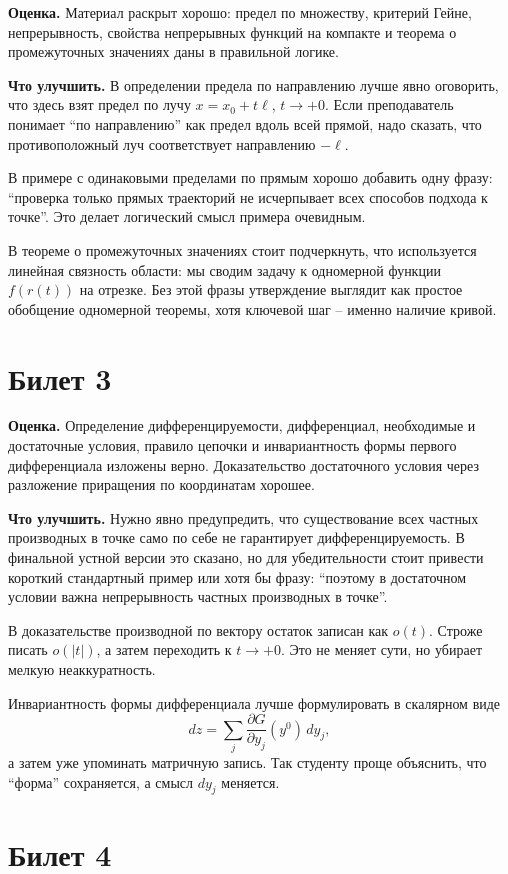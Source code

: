 \documentclass[12pt,a4paper]{article}
\begin{document}
\textbf{Оценка.} Материал раскрыт хорошо: предел по множеству, критерий
Гейне, непрерывность, свойства непрерывных функций на компакте и теорема о
промежуточных значениях даны в правильной логике.

\textbf{Что улучшить.}
В определении предела по направлению лучше явно оговорить, что здесь взят
предел по лучу \(x=x_0+t\ell\), \(t\to+0\). Если преподаватель понимает
``по направлению'' как предел вдоль всей прямой, надо сказать, что
противоположный луч соответствует направлению \(-\ell\).

В примере с одинаковыми пределами по прямым хорошо добавить одну фразу:
``проверка только прямых траекторий не исчерпывает всех способов подхода к
точке''. Это делает логический смысл примера очевидным.

В теореме о промежуточных значениях стоит подчеркнуть, что используется
линейная связность области: мы сводим задачу к одномерной функции
\(f(r(t))\) на отрезке. Без этой фразы утверждение выглядит как простое
обобщение одномерной теоремы, хотя ключевой шаг -- именно наличие кривой.

\section*{Билет 3}

\textbf{Оценка.} Определение дифференцируемости, дифференциал, необходимые и
достаточные условия, правило цепочки и инвариантность формы первого
дифференциала изложены верно. Доказательство достаточного условия через
разложение приращения по координатам хорошее.

\textbf{Что улучшить.}
Нужно явно предупредить, что существование всех частных производных в точке
само по себе не гарантирует дифференцируемость. В финальной устной версии это
сказано, но для убедительности стоит привести короткий стандартный пример или
хотя бы фразу: ``поэтому в достаточном условии важна непрерывность частных
производных в точке''.

В доказательстве производной по вектору остаток записан как \(o(t)\). Строже
писать \(o(|t|)\), а затем переходить к \(t\to+0\). Это не меняет сути, но
убирает мелкую неаккуратность.

Инвариантность формы дифференциала лучше формулировать в скалярном виде
\[
  dz=\sum_j \frac{\partial G}{\partial y_j}(y^0)\,dy_j,
\]
а затем уже упоминать матричную запись. Так студенту проще объяснить, что
``форма'' сохраняется, а смысл \(dy_j\) меняется.

\section*{Билет 4}
\end{document}
